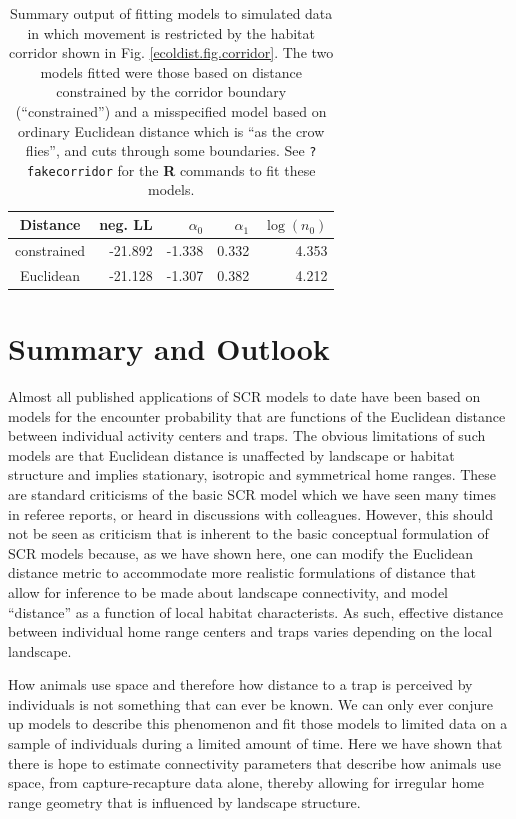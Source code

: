 \begin{table}
\centering
\caption{
Summary output of fitting models to simulated data in which movement
is restricted by the habitat corridor shown in 
Fig. \ref{ecoldist.fig.corridor}. The two models fitted were those
based on distance  constrained by the corridor boundary
(``constrained'') and a misspecified model based on ordinary Euclidean
distance which is ``as the crow flies'', and cuts through some
boundaries. 
See \mbox{\tt ?fakecorridor} for the {\bf R} commands to fit these
models. 
}
\begin{tabular}{c|rrrr} \hline \hline 
Distance    &  neg. LL &    $\alpha_0$   & $\alpha_1$    & $\log(n_0)$ \\ \hline
constrained & -21.892 &  -1.338 & 0.332 & 4.353 \\
Euclidean   & -21.128 &  -1.307 & 0.382 & 4.212 \\ \hline
\end{tabular}
\label{rsf.tab.fakecorridor}
\end{table}



\section{Summary and Outlook}


Almost
all published applications of SCR models to date have been based on
models for the encounter probability that are functions of the
Euclidean distance between individual activity centers and traps. The
obvious limitations of such models are that Euclidean
distance is unaffected by landscape or habitat
structure and implies stationary, isotropic and symmetrical home
ranges. These are standard criticisms of the basic SCR model which we
have seen many times in referee reports, or heard in discussions with
colleagues. However, this should not be seen as criticism
that is inherent to the basic conceptual formulation of SCR models because,
as we have shown here, %
one can modify the Euclidean distance metric
to accommodate more realistic
formulations of distance that allow for inference to be made about
landscape connectivity, and model ``distance'' as a function of
local habitat characterists. As such, effective distance between individual home
range centers and traps varies depending on the local landscape.

How animals use space and therefore how distance to a trap is
perceived by individuals is not something that can ever be known. We
can only ever conjure up models to describe this phenomenon and fit
those models to limited data on a sample of individuals during a
limited amount of time.  Here we have shown that there is hope to
estimate connectivity parameters
that describe how
animals use space,  from capture-recapture data alone, 
thereby allowing  for irregular home range geometry
that is influenced by landscape structure.

